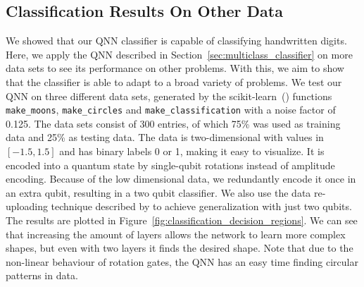 \documentclass[a4paper,10pt]{article}
\begin{document}
\begin{appendices}
	\section{Classification Results On Other Data} \label{sec:classification-other}
	We showed that our QNN classifier is capable of classifying handwritten digits.
	Here, we apply the QNN described in Section~\ref{sec:multiclass_classifier} on more data sets to see its performance on other problems.
	With this, we aim to show that the classifier is able to adapt to a broad variety of problems.
	We test our QNN on three different data sets, generated by the scikit-learn~(\cite{scikit-learn}) functions \verb|make_moons|, \verb|make_circles| and \verb|make_classification| with a noise factor of 0.125.
	The data sets consist of 300 entries, of which 75\% was used as training data and 25\% as testing data.
	The data is two-dimensional with values in $[-1.5, 1.5]$ and has binary labels 0 or 1, making it easy to visualize.
	It is encoded into a quantum state by single-qubit rotations instead of amplitude encoding.
	Because of the low dimensional data, we redundantly encode it once in an extra qubit, resulting in a two qubit classifier.
	We also use the data re-uploading technique described by \cite{perez2019data} to achieve generalization with just two qubits.
	The results are plotted in Figure~\ref{fig:classification_decision_regions}.
	We can see that increasing the amount of layers allows the network to learn more complex shapes, but even with two layers it finds the desired shape.
	Note that due to the non-linear behaviour of rotation gates, the QNN has an easy time finding circular patterns in data.
	

\end{appendices}
\end{document}
